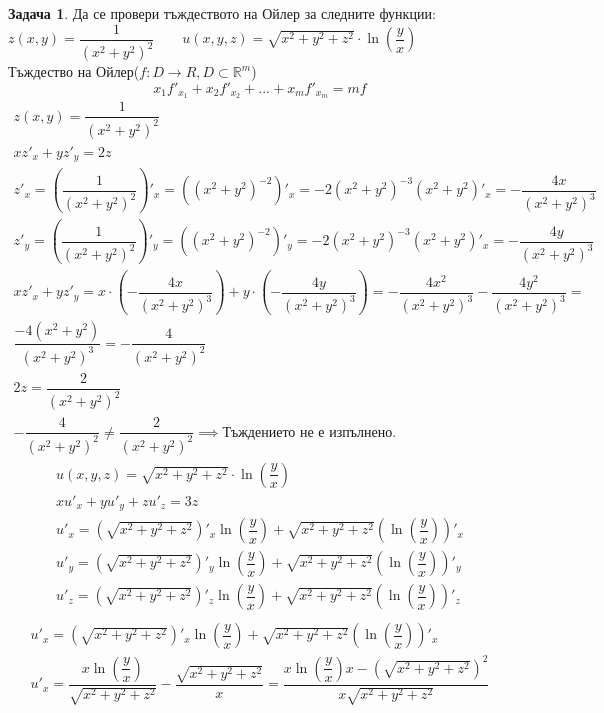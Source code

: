 \documentclass[a4paper,fleqn,12pt]{article}
\theoremstyle{definition}
\newtheorem{task}{Задача}[subsection]
\begin{document}
\begin{task}
Да се провери тъждеството на Ойлер за следните функции:
$z(x,y) = \dfrac{1}{(x^2+y^2)^2}\qquad u(x,y,z) = \sqrt{x^2+y^2+z^2}\cdot \ln{\left( \dfrac{y}{x}\right)}$\\
Тъждество на Ойлер($f:D \to R, D\subset \mathbb{R}^m$)
$$x_1f'_{x_1} + x_2f'_{x_2} + ... +x_mf'_{x_m} = mf$$
\begin{gather*}
z(x,y) = \dfrac{1}{(x^2+y^2)^2} \\
xz'_x +yz'_y = 2z \\
z'_x = \left( \dfrac{1}{(x^2+y^2)^2}\right)'_x = \left((x^2+y^2)^{-2}\right)'_x = -2(x^2+y^2)^{-3}(x^2+y^2)'_x =-\dfrac{4x}{(x^2+y^2)^3}\\
z'_y = \left( \dfrac{1}{(x^2+y^2)^2}\right)'_y = \left((x^2+y^2)^{-2}\right)'_y = -2(x^2+y^2)^{-3}(x^2+y^2)'_x =-\dfrac{4y}{(x^2+y^2)^3}\\
xz'_x +yz'_y = x \cdot \left( - \dfrac{4x}{(x^2+y^2)^3} \right)+ y \cdot \left( - \dfrac{4y}{(x^2+y^2)^3}\right) = -\dfrac{4x^2}{(x^2+y^2)^3} - \dfrac{4y^2}{(x^2+y^2)^3} = \\
\dfrac{-4(x^2+y^2)}{(x^2+y^2)^3} = -\dfrac{4}{(x^2+y^2)^2}\\
2z = \dfrac{2}{(x^2+y^2)^2}\\
-\dfrac{4}{(x^2+y^2)^2} \neq  \dfrac{2}{(x^2+y^2)^2} \implies \text{Тъждението не е изпълнено.}
\end{gather*}
\begin{gather*}
u(x,y,z) = \sqrt{x^2+y^2+z^2}\cdot \ln{\left( \dfrac{y}{x}\right)}\\
xu'_x + yu'_y + zu'_z = 3z \\
u'_x = \left(\sqrt{x^2+y^2+z^2}\right)'_x \ln{\left( \dfrac{y}{x}\right)} + \sqrt{x^2+y^2+z^2}\left( \ln{\left( \dfrac{y}{x}\right)}\right)'_x \\
u'_y = \left(\sqrt{x^2+y^2+z^2}\right)'_y \ln{\left( \dfrac{y}{x}\right)} + \sqrt{x^2+y^2+z^2}\left( \ln{\left( \dfrac{y}{x}\right)}\right)'_y \\
u'_z = \left(\sqrt{x^2+y^2+z^2}\right)'_z\ln{\left( \dfrac{y}{x}\right)} + \sqrt{x^2+y^2+z^2}\left( \ln{\left( \dfrac{y}{x}\right)}\right)'_z \\
\end{gather*}
\begin{gather*}
u'_x = \left(\sqrt{x^2+y^2+z^2}\right)'_x \ln{\left( \dfrac{y}{x}\right)} + \sqrt{x^2+y^2+z^2}\left( \ln{\left( \dfrac{y}{x}\right)}\right)'_x \\
u'_x = \dfrac{x\ln{\left( \dfrac{y}{x}\right)}}{\sqrt{x^2+y^2+z^2}} - \dfrac{\sqrt{x^2+y^2+z^2}}{x} = \dfrac{x\ln{\left( \dfrac{y}{x}\right)}x - \left(\sqrt{x^2+y^2+z^2}\right)^2}{x\sqrt{x^2+y^2+z^2}}\\

\end{gather*}
\end{task}
\end{document}
